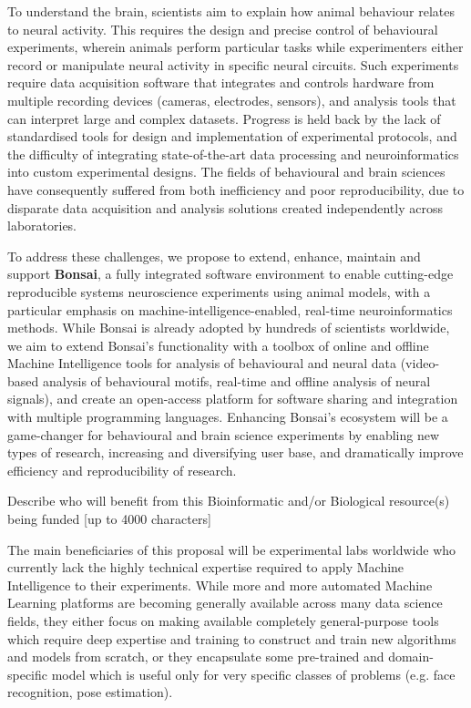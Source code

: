 To understand the brain, scientists aim to explain how animal behaviour relates to neural activity. This requires the design and precise control of behavioural experiments, wherein animals perform particular tasks while experimenters either record or manipulate neural activity in specific neural circuits. Such experiments require data acquisition software that integrates and controls hardware from multiple recording devices (cameras, electrodes, sensors), and analysis tools that can interpret large and complex datasets. Progress is held back by the lack of standardised tools for design and implementation of experimental protocols, and the difficulty of integrating state-of-the-art data processing and neuroinformatics into custom experimental designs. The fields of behavioural and brain sciences have consequently suffered from both inefficiency and poor reproducibility, due to disparate data acquisition and analysis solutions created independently across laboratories.   

To address these challenges, we propose to extend, enhance, maintain and support \textbf{Bonsai}, a fully integrated software environment to enable cutting-edge reproducible systems neuroscience experiments using animal models, with a particular emphasis on machine-intelligence-enabled, real-time neuroinformatics methods. While Bonsai is already adopted by hundreds of scientists worldwide, we aim to extend Bonsai’s functionality with a toolbox of online and offline Machine Intelligence tools for analysis of behavioural and neural data (video-based analysis of behavioural motifs, real-time and offline analysis of neural signals), and create an open-access platform for software sharing and integration with multiple programming languages. Enhancing Bonsai's ecosystem will be a game-changer for behavioural and brain science experiments by enabling new types of research, increasing and diversifying user base, and dramatically improve efficiency and reproducibility of research.


Describe who will benefit from this Bioinformatic and/or Biological resource(s) being funded [up to 4000 characters]

The main beneficiaries of this proposal will be experimental labs worldwide who currently lack the highly technical expertise required to apply Machine Intelligence to their experiments. While more and more automated Machine Learning platforms are becoming generally available across many data science fields, they either focus on making available completely general-purpose tools which require deep expertise and training to construct and train new algorithms and models from scratch, or they encapsulate some pre-trained and domain-specific model which is useful only for very specific classes of problems (e.g. face recognition, pose estimation).

